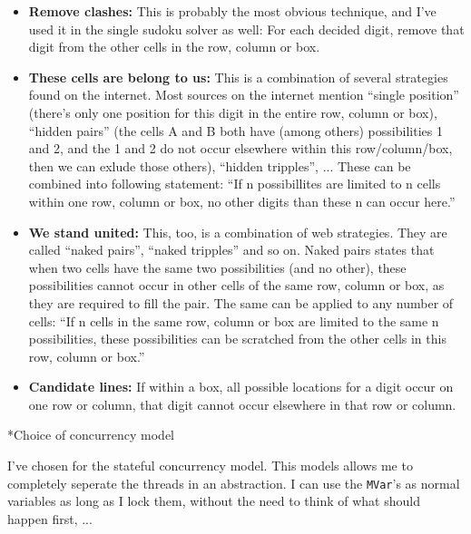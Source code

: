 \documentclass[a4paper,12pt]{article}
\begin{document}
\begin{section}
\begin{subsection}
        \begin{itemize}
            \item \textbf{Remove clashes:} This is probably the most obvious
                technique, and I've used it in the single sudoku solver as well:
                For each decided digit, remove that digit from the other cells
                in the row, column or box.
            \item \textbf{These cells are belong to us:} This is a combination
                of several strategies found on the internet. Most sources on the
                internet mention ``single position'' (there's only one position
                for this digit in the entire row, column or box), ``hidden
                pairs'' (the cells A and B both have (among others)
                possibilities 1 and 2, and the 1 and 2 do not occur elsewhere
                within this row/column/box, then we can exlude those others),
                ``hidden tripples'', ... These can be combined into following
                statement: ``If n possibillites are limited to n cells within
                one row, column or box, no other digits than these n can occur
                here.''
            \item \textbf{We stand united:} This, too, is a combination of web
                strategies. They are called ``naked pairs'', ``naked tripples''
                and so on. Naked pairs states that when two cells have the same
                two possibilities (and no other), these possibilities cannot
                occur in other cells of the same row, column or box, as they are
                required to fill the pair. The same can be applied to any number
                of cells: ``If n cells in the same row, column or box are
                limited to the same n possibilities, these possibilities can be
                scratched from the other cells in this row, column or box.''
            \item \textbf{Candidate lines:} If within a box, all possible
                locations for a digit occur on one row or column, that digit
                cannot occur elsewhere in that row or column.
        \end{itemize}

    \end{subsection}


    \begin{subsection}*{Choice of concurrency model}

        I've chosen for the stateful concurrency model. This models allows me to
        completely seperate the threads in an abstraction. I can use the
        \texttt{MVar}'s as normal variables as long as I lock them, without the
        need to think of what should happen first, ...


\end{subsection}
\end{section}
\end{document}
